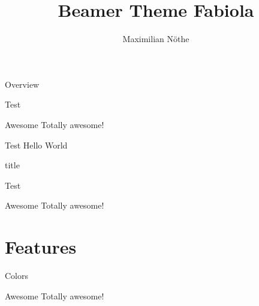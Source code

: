\documentclass[aspectratio=1610]{beamer}
\title{Beamer Theme Fabiola}
\author{Maximilian Nöthe}
\institute{TU Dortmund}
\begin{document}
  \begin{frame}
    \titlepage
  \end{frame}

  \begin{frame}{Overview}
    \tableofcontents
  \end{frame}
  
  \begin{frame}{Test}
    \begin{block}{Awesome}
      Totally awesome!
    \end{block} 
    \blindtext
  \end{frame}
  
  \begin{frame}{Test}
    Hello World
    \begin{block}{title}
      \blindtext
    \end{block}
  \end{frame}

  \begin{frame}{Test}
    \begin{block}{Awesome}
      Totally awesome!
    \end{block} 
    \blindtext
  \end{frame}

  \section{Features}

  \begin{frame}{Colors}
    \begin{block}{Awesome}
      Totally awesome!
    \end{block} 
    \blindtext
  \end{frame}
\end{document}
